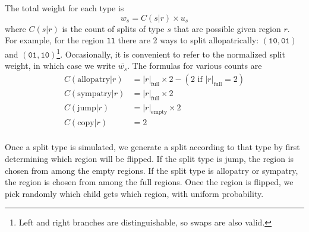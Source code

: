\documentclass{article}
\newcommand{\CountFull}[1]{|#1|_\text{full}}
\newcommand{\CountEmpty}[1]{|#1|_\text{empty}}
\begin{document}
The total weight for each type is
\begin{equation}
	w_s = C(s|r) \times u_s
\end{equation}
where $C(s|r)$ is the count of splits of type $s$ that are
possible given region $r$.
For example, for the region \texttt{11} there are 2 ways to split
allopatrically: $(\texttt{10}, \texttt{01})$ and $(\texttt{01},
\texttt{10})$\footnote{Left and right branches are distinguishable, so swaps
	are also valid.}\footnotemark.
Occasionally, it is convenient to refer to the normalized split weight, in
which case we write \( \overline{w_s} \).
The formulas for various counts are
\begin{align*}
  C(\text{allopatry}|r) & =
  \CountFull{r} \times 2 - (2 \text{ if } \CountFull{r} = 2) \\
  C(\text{sympatry}|r)  & = \CountFull{r} \times 2           \\ C(\text{jump}|r) & =
  \CountEmpty{r} \times 2                                    \\ C(\text{copy}|r) & = 2 \\
\end{align*}


Once a split type is simulated, we generate
a split according to that type by first determining which region will be
flipped\footnotemark.
If the split type is jump, the region is chosen from among the empty regions.
If the split type is allopatry or sympatry, the region is chosen from among the
full regions.
Once the region is flipped, we pick randomly which child gets which region,
with uniform probability.

\end{document}
